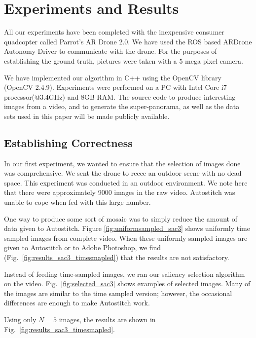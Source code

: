 \section{Experiments and Results}
\label{sec:results}

All our experiments have been completed with the inexpensive consumer
quadcopter called Parrot's AR Drone 2.0. We have used the ROS based
ARDrone Autonomy Driver to communicate with the drone. For the
purposes of establishing the ground truth, pictures were taken with a
5 mega pixel camera.

We have implemented our algorithm in C++ using the OpenCV library
(OpenCV 2.4.9). Experiments were performed on a PC with Intel Core i7
processor(@3.4GHz) and 8GB RAM.  The source code to produce
interesting images from a video, and to generate the super-panorama,
as well as the data sets used in this paper will be made publicly
available.


\subsection{Establishing Correctness}

In our first experiment, we wanted to ensure that the selection of
images done was comprehensive.  We sent the drone to recce an outdoor
scene with no dead space. This experiment was conducted in an outdoor
environment. We note here that there were approximately 9000 images in
the raw video.  Autostitch was unable to cope when fed with this large
number. 

One way to produce some sort of mosaic was to simply reduce the amount
of data given to Autostitch.  Figure \ref{fig:uniformsampled_sac3}
shows uniformly time sampled images from complete video.  When these
uniformly sampled images are given to Autostitch or to Adobe
Photoshop, we find (Fig.~\ref{fig:results_sac3_timesmapled})  that the
results are not satisfactory.

Instead of feeding time-sampled images, we ran our saliency selection
algorithm on the video. Fig.~\ref{fig:selected_sac3} shows examples of
selected images. Many of the images are similar to the time sampled
version; however, the occasional differences are enough to make
Autostitch work. 

Using only $N=5$ images, the results are shown in
Fig.~\ref{fig:results_sac3_timesmapled}.


